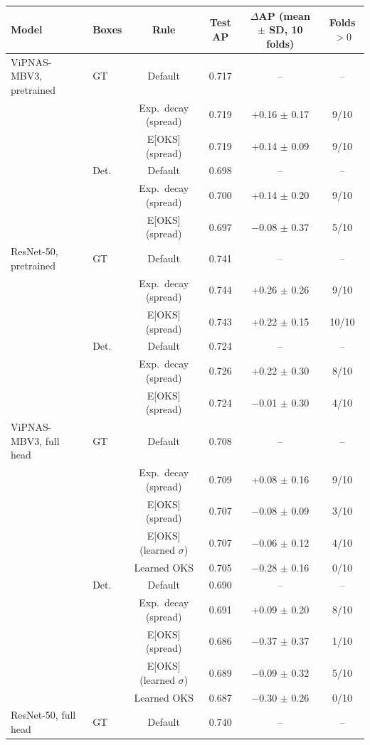 \begin{tabular}{llcccc}
\toprule
Model & Boxes & Rule & Test AP & $\Delta$AP (mean $\pm$ SD, 10 folds) & Folds $>0$ \\
\midrule
ViPNAS-MBV3, pretrained & GT & Default & 0.717 & -- & -- \\
 &  & Exp.\ decay (spread) & 0.719 & +0.16 $\pm$ 0.17 & 9/10 \\
 &  & E[OKS] (spread) & 0.719 & +0.14 $\pm$ 0.09 & 9/10 \\
\addlinespace
 & Det. & Default & 0.698 & -- & -- \\
 &  & Exp.\ decay (spread) & 0.700 & +0.14 $\pm$ 0.20 & 9/10 \\
 &  & E[OKS] (spread) & 0.697 & \ensuremath{-}0.08 $\pm$ 0.37 & 5/10 \\
\addlinespace
ResNet-50, pretrained & GT & Default & 0.741 & -- & -- \\
 &  & Exp.\ decay (spread) & 0.744 & +0.26 $\pm$ 0.26 & 9/10 \\
 &  & E[OKS] (spread) & 0.743 & +0.22 $\pm$ 0.15 & 10/10 \\
\addlinespace
 & Det. & Default & 0.724 & -- & -- \\
 &  & Exp.\ decay (spread) & 0.726 & +0.22 $\pm$ 0.30 & 8/10 \\
 &  & E[OKS] (spread) & 0.724 & \ensuremath{-}0.01 $\pm$ 0.30 & 4/10 \\
\addlinespace
ViPNAS-MBV3, full head & GT & Default & 0.708 & -- & -- \\
 &  & Exp.\ decay (spread) & 0.709 & +0.08 $\pm$ 0.16 & 9/10 \\
 &  & E[OKS] (spread) & 0.707 & \ensuremath{-}0.08 $\pm$ 0.09 & 3/10 \\
 &  & E[OKS] (learned $\sigma$) & 0.707 & \ensuremath{-}0.06 $\pm$ 0.12 & 4/10 \\
 &  & Learned OKS & 0.705 & \ensuremath{-}0.28 $\pm$ 0.16 & 0/10 \\
\addlinespace
 & Det. & Default & 0.690 & -- & -- \\
 &  & Exp.\ decay (spread) & 0.691 & +0.09 $\pm$ 0.20 & 8/10 \\
 &  & E[OKS] (spread) & 0.686 & \ensuremath{-}0.37 $\pm$ 0.37 & 1/10 \\
 &  & E[OKS] (learned $\sigma$) & 0.689 & \ensuremath{-}0.09 $\pm$ 0.32 & 5/10 \\
 &  & Learned OKS & 0.687 & \ensuremath{-}0.30 $\pm$ 0.26 & 0/10 \\
\addlinespace
ResNet-50, full head & GT & Default & 0.740 & -- & -- \\

\end{tabular}
